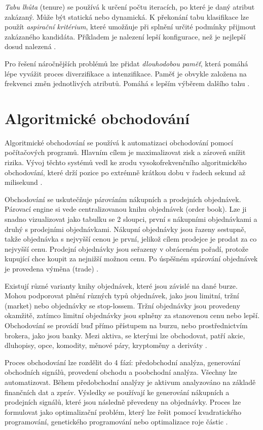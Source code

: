 \textit{Tabu lhůta} (tenure) se používá k určení počtu iteracích, po které je daný atribut zakázaný.
Může být statická nebo dynamická.
K překonání tabu klasifikace lze použít \textit{aspirační kritérium}, které umožňuje při splnění určité podmínky přijmout zakázaného kandidáta.
Příkladem je nalezení lepší konfigurace, než je nejlepší dosud nalezená \cite{laguna}.

Pro řešení náročnějších problémů lze přidat \textit{dlouhodobou paměť}, která pomáhá lépe vyvážit proces diverzifikace a intenzifikace.
Paměť je obvykle založena na frekvenci změn jednotlivých atributů.
Pomáhá s lepším výběrem dalšího tahu \cite{laguna}.

\chapter{Algoritmické obchodování}
Algoritmické obchodování se používá k automatizaci obchodování pomocí počítačových programů.
Hlavním cílem je maximalizovat zisk a zároveň snížit rizika.
Vývoj těchto systémů vedl ke zrodu vysokofrekvenčního algoritmického obchodování, které drží pozice po extrémně krátkou dobu v řadech sekund až milisekund \cite{nuti, treleaven}.

Obchodování se uskutečňuje párováním nákupních a prodejních objednávek.
Párovací engine si vede centralizovanou knihu objednávek (order book).
Lze ji snadno vizualizovat jako tabulku se 2 sloupci, první s nákupními objednávkami a druhý s prodejními objednávkami.
Nákupní objednávky jsou řazeny sestupně, takže objednávka s nejvyšší cenou je první, jelikož cílem prodejce je prodat za co nejvyšší cenu.
Prodejní objednávky jsou seřazeny v obráceném pořadí, protože kupující chce koupit za nejnižší možnou cenu.
Po úspěšném spárování objednávek je provedena výměna (trade) \cite{nuti}.

Existují různé varianty knihy objednávek, které jsou závislé na dané burze.
Mohou podporovat plnění různých typů objednávek, jako jsou limitní, tržní (market) nebo objednávky se stop-lossem.
Tržní objednávky jsou provedeny okamžitě, zatímco limitní objednávky jsou splněny za stanovenou cenu nebo lepší.
Obchodování se provádí buď přímo přístupem na burzu, nebo prostřednictvím brokera, jako jsou banky.
Mezi aktiva, se kterými lze obchodovat, patří akcie, dluhopisy, opce, komodity, měnové páry, kryptoměny a deriváty \cite{nuti}.

Proces obchodování lze rozdělit do 4 fází: předobchodní analýza, generování obchodních signálů, provedení obchodu a poobchodní analýza.
Všechny lze automatizovat.
Během předobchodní analýzy je aktivum analyzováno na základě finančních dat a zpráv.
Výsledky se používají ke generování nákupních a prodejních signálů, které jsou následně převedeny na objednávky.
Proces lze formulovat jako optimalizační problém, který lze řešit pomocí kvadratického programování, genetického programování nebo optimalizace roje částic \cite{nuti}.


